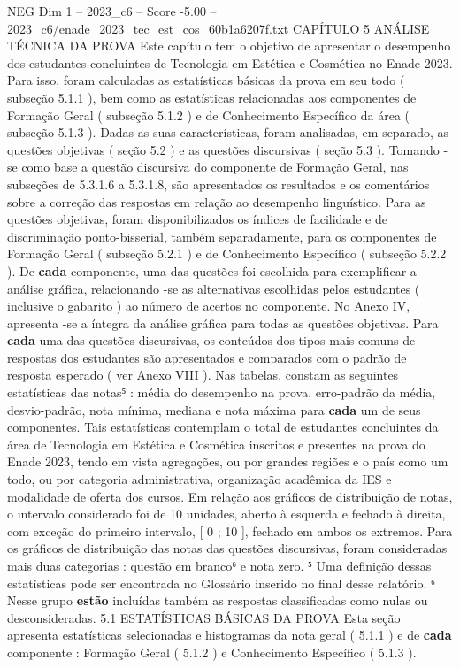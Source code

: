 \begin{textsample}{NEG Dim 1 – 2023\_c6 – Score -5.00 – 2023\_c6/enade\_2023\_tec\_est\_cos\_60b1a6207f.txt}  \label{ex:f1_neg_201}
CAPÍTULO 5 ANÁLISE TÉCNICA DA PROVA Este capítulo tem o objetivo de apresentar o desempenho dos estudantes concluintes de Tecnologia em Estética e Cosmética no Enade 2023.
Para isso, foram calculadas as estatísticas básicas da prova em seu todo ( subseção 5.1.1 ), bem como as estatísticas relacionadas aos componentes de Formação Geral ( subseção 5.1.2 ) e de Conhecimento Específico da área ( subseção 5.1.3 ).
Dadas as suas características, foram analisadas, em separado, as questões objetivas ( seção 5.2 ) e as questões discursivas ( seção 5.3 ).
Tomando -se como base a questão discursiva do componente de Formação Geral, nas subseções de 5.3.1.6 a 5.3.1.8, são apresentados os resultados e os comentários sobre a correção das respostas em relação ao desempenho linguístico.
Para as questões objetivas, foram disponibilizados os índices de facilidade e de discriminação ponto-bisserial, também separadamente, para os componentes de Formação Geral ( subseção 5.2.1 ) e de Conhecimento Específico ( subseção 5.2.2 ).
De \textbf{cada} componente, uma das questões foi escolhida para exemplificar a análise gráfica, relacionando -se as alternativas escolhidas pelos estudantes ( inclusive o gabarito ) ao número de acertos no componente.
No Anexo IV, apresenta -se a íntegra da análise gráfica para todas as questões objetivas.
Para \textbf{cada} uma das questões discursivas, os conteúdos dos tipos mais comuns de respostas dos estudantes são apresentados e comparados com o padrão de resposta esperado ( ver Anexo VIII ).
Nas tabelas, constam as seguintes estatísticas das notas⁵ : média do desempenho na prova, erro-padrão da média, desvio-padrão, nota mínima, mediana e nota máxima para \textbf{cada} um de seus componentes.
Tais estatísticas contemplam o total de estudantes concluintes da área de Tecnologia em Estética e Cosmética inscritos e presentes na prova do Enade 2023, tendo em vista agregações, ou por grandes regiões e o país como um todo, ou por categoria administrativa, organização acadêmica da IES e modalidade de oferta dos cursos.
Em relação aos gráficos de distribuição de notas, o intervalo considerado foi de 10 unidades, aberto à esquerda e fechado à direita, com exceção do primeiro intervalo, [ 0 ; 10 ], fechado em ambos os extremos.
Para os gráficos de distribuição das notas das questões discursivas, foram consideradas mais duas categorias : questão em branco⁶ e nota zero. ⁵ Uma definição dessas estatísticas pode ser encontrada no Glossário inserido no final desse relatório. ⁶ Nesse grupo \textbf{estão} incluídas também as respostas classificadas como nulas ou desconsideradas. 5.1 ESTATÍSTICAS BÁSICAS DA PROVA Esta seção apresenta estatísticas selecionadas e histogramas da nota geral ( 5.1.1 ) e de \textbf{cada} componente : Formação Geral ( 5.1.2 ) e Conhecimento Específico ( 5.1.3 ).

\end{textsample}
